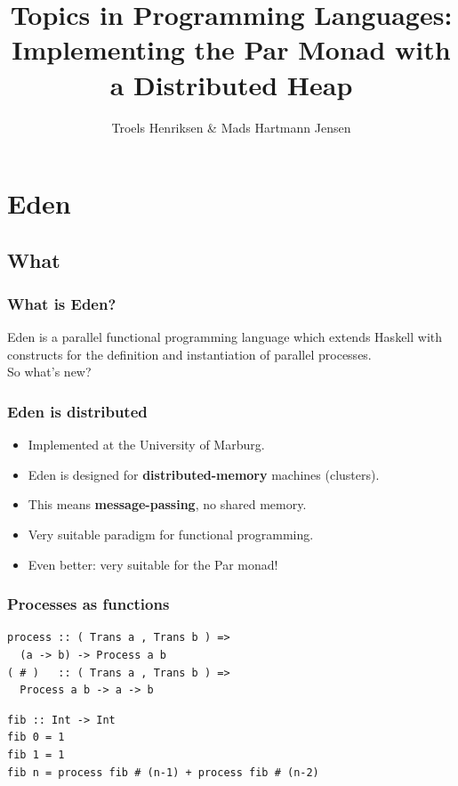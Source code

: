 \documentclass[12pt, danish]{beamer}
\title{Topics in Programming Languages:\\Implementing the Par Monad with a Distributed Heap}
\author{Troels Henriksen \& Mads Hartmann Jensen}
\begin{document}
\begin{frame}
\titlepage
\end{frame}

\section{Eden}

\subsection{What}

\begin{frame}
\frametitle{What is Eden?}

Eden is a parallel functional programming language which extends
Haskell with constructs for the definition and instantiation of
parallel processes.\\
\pause
So what's new?
\end{frame}

\begin{frame}
\frametitle{Eden is distributed}

\begin{itemize}
\item Implemented at the University of Marburg.\pause
\item Eden is designed for \textbf{distributed-memory} machines
  (clusters).\pause
\item This means \textbf{message-passing}, no shared memory.\pause
\item Very suitable paradigm for functional programming.\pause
\item Even better: very suitable for the Par monad!
\end{itemize}
\end{frame}

\begin{frame}[fragile]
\frametitle{Processes as functions}

\begin{verbatim}
process :: ( Trans a , Trans b ) =>
  (a -> b) -> Process a b
( # )   :: ( Trans a , Trans b ) =>
  Process a b -> a -> b
\end{verbatim}
\pause
\begin{verbatim}
fib :: Int -> Int
fib 0 = 1
fib 1 = 1
fib n = process fib # (n-1) + process fib # (n-2)
\end{verbatim}
\end{frame}
\end{document}
